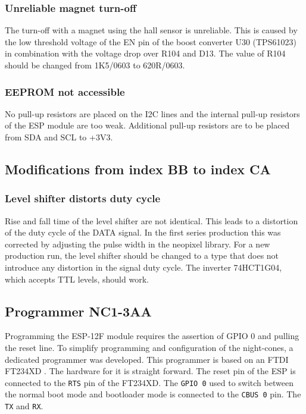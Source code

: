 \subsubsection{Unreliable magnet turn-off}
The turn-off with a magnet using the hall sensor is unreliable. This is caused by the low threshold voltage of the EN pin of the boost converter U30 (TPS61023) in combination with the voltage drop over R104 and D13. The value of R104 should be changed from 1K5/0603 to 620R/0603. 

\subsubsection{EEPROM not accessible}
No pull-up resistors are placed on the \ac{I2C} lines and the internal pull-up resistors of the ESP module are too weak. Additional pull-up resistors are to be placed from SDA and SCL to +3V3. 

\subsection{Modifications from index BB to index CA}

\subsubsection{Level shifter distorts duty cycle}
Rise and fall time of the level shifter are not identical. This leads to a distortion of the duty cycle of the DATA signal. In the first series production this was corrected by adjusting the pulse width in the neopixel library. 
For a new production run, the level shifter should be changed to a type that does not introduce any distortion in the signal duty cycle. 
The inverter 74HCT1G04, which accepts TTL levels, should work. 

\FloatBarrier

\subsection{Programmer NC1-3AA}

Programming the ESP-12F module requires the assertion of GPIO 0 and pulling the reset line. To simplify programming and configuration of the night-cones, a dedicated programmer was developed. This programmer is based on an FTDI FT234XD \cite{FTDI:FT234XD}. The hardware for it is straight forward. The reset pin of the ESP is connected to the \texttt{RTS} pin of the FT234XD. The \texttt{GPIO 0} used to switch between the normal boot mode and bootloader mode is connected to the \texttt{CBUS 0} pin. The \texttt{TX} and \texttt{RX}. 

